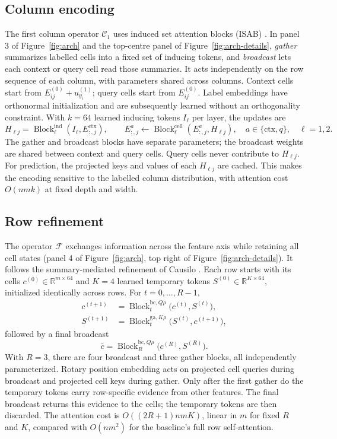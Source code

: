\documentclass[11pt]{article}
\newcommand{\R}{\mathbb{R}}
\newcommand{\Block}{\operatorname{Block}}
\begin{document}
\subsection{Column encoding}
The first column operator $\mathcal{C}_1$ uses induced set attention blocks (ISAB) \cite{lee2019}.
In panel 3 of Figure~\ref{fig:arch} and the top-centre panel of Figure~\ref{fig:arch-details},
\emph{gather} summarizes labelled cells into a fixed set of inducing tokens, and \emph{broadcast}
lets each context or query cell read those summaries.
It acts independently on the row sequence of each column, with parameters shared across columns.
Context cells start from $E^{(0)}_{ij}+u^{(1)}_{y_i}$; query cells start from $E^{(0)}_{ij}$.
Label embeddings have orthonormal initialization and are subsequently learned without an
orthogonality constraint. With $k=64$ learned inducing tokens $I_\ell$ per layer, the updates are
\begin{equation}
H_{\ell j}=\Block^{\mathrm{ind}}_\ell(I_\ell,E^{\mathrm{ctx}}_{:,j}),\qquad
E^a_{:,j}\leftarrow\Block^{\mathrm{cell}}_\ell(E^a_{:,j},H_{\ell j}),
\quad a\in\{\mathrm{ctx},q\},\quad \ell=1,2.
\end{equation}
The gather and broadcast blocks have separate parameters; the broadcast weights are shared between
context and query cells. Query cells never contribute to $H_{\ell j}$. For prediction, the projected
keys and values of each $H_{\ell j}$ are cached. This makes the encoding sensitive to the labelled
column distribution, with attention cost $O(nmk)$ at fixed depth and width.

\subsection{Row refinement}
The operator $\mathcal{F}$ exchanges information across the feature axis while retaining all cell
states (panel 4 of Figure~\ref{fig:arch}, top right of Figure~\ref{fig:arch-details}).
It follows the summary-mediated refinement of Causilo \cite{causilo}. Each row starts with
its cells $c^{(0)}\in\R^{m\times64}$ and $K=4$ learned temporary tokens
$S^{(0)}\in\R^{K\times64}$, initialized identically across rows. For $t=0,\dots,R-1$,
\begin{align}
c^{(t+1)}&=\Block_t^{\mathrm{bc},Q\rho}\big(c^{(t)},S^{(t)}\big),\\
S^{(t+1)}&=\Block_t^{\mathrm{ga},K\rho}\big(S^{(t)},c^{(t+1)}\big),
\end{align}
followed by a final broadcast
\begin{equation}
\bar c=\Block_R^{\mathrm{bc},Q\rho}\big(c^{(R)},S^{(R)}\big).
\end{equation}
With $R=3$, there are four broadcast and three gather blocks, all independently parameterized.
Rotary position embedding \cite{su2024} acts on projected cell queries during broadcast and
projected cell keys during gather. Only after the first gather do the temporary tokens carry
row-specific evidence from other features. The final broadcast returns this evidence to the cells;
the temporary tokens are then discarded. The attention cost is $O((2R+1)nmK)$, linear in $m$
for fixed $R$ and $K$, compared with $O(nm^2)$ for the baseline's full row self-attention.
\end{document}
